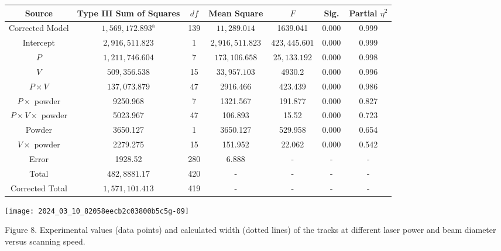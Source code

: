 \documentclass[10pt]{article}
\begin{document}
\begin{center}
\begin{tabular}{|c|c|c|c|c|c|c|}
\hline
Source & Type III Sum of Squares & $d f$ & Mean Square & $F$ & Sig. & Partial $\eta^{2}$ \\
\hline
Corrected Model & $1,569,172.893^{\mathrm{a}}$ & 139 & $11,289.014$ & 1639.041 & 0.000 & 0.999 \\
\hline
Intercept & $2,916,511.823$ & 1 & $2,916,511.823$ & $423,445.601$ & 0.000 & 0.999 \\
\hline
$P$ & $1,211,746.604$ & 7 & $173,106.658$ & $25,133.192$ & 0.000 & 0.998 \\
\hline
$V$ & $509,356.538$ & 15 & $33,957.103$ & 4930.2 & 0.000 & 0.996 \\
\hline
$P \times V$ & $137,073.879$ & 47 & 2916.466 & 423.439 & 0.000 & 0.986 \\
\hline
$P \times$ powder & 9250.968 & 7 & 1321.567 & 191.877 & 0.000 & 0.827 \\
\hline
$P \times V \times$ powder & 5023.967 & 47 & 106.893 & 15.52 & 0.000 & 0.723 \\
\hline
Powder & 3650.127 & 1 & 3650.127 & 529.958 & 0.000 & 0.654 \\
\hline
$V \times$ powder & 2279.275 & 15 & 151.952 & 22.062 & 0.000 & 0.542 \\
\hline
Error & 1928.52 & 280 & 6.888 & - & - & - \\
\hline
Total & $482,8881.17$ & 420 & - & - & - & - \\
\hline
Corrected Total & $1,571,101.413$ & 419 & - & - & - & - \\
\hline
\end{tabular}
\end{center}

\begin{center}
\texttt{[image: 2024\_03\_10\_82058eecb2c03800b5c5g-09]}
\end{center}

Figure 8. Experimental values (data points) and calculated width (dotted lines) of the tracks at different laser power and beam diameter versus scanning speed.
\end{document}
